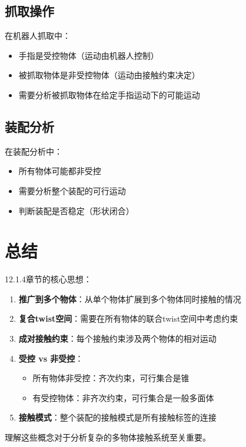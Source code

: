 \documentclass[12pt,a4paper]{article}
\begin{document}
\subsection{抓取操作}

在机器人抓取中：
\begin{itemize}
\item 手指是受控物体（运动由机器人控制）
\item 被抓取物体是非受控物体（运动由接触约束决定）
\item 需要分析被抓取物体在给定手指运动下的可能运动
\end{itemize}

\subsection{装配分析}

在装配分析中：
\begin{itemize}
\item 所有物体可能都非受控
\item 需要分析整个装配的可行运动
\item 判断装配是否稳定（形状闭合）
\end{itemize}

\section{总结}

12.1.4章节的核心思想：

\begin{enumerate}
\item \textbf{推广到多个物体}：从单个物体扩展到多个物体同时接触的情况

\item \textbf{复合twist空间}：需要在所有物体的联合twist空间中考虑约束

\item \textbf{成对接触约束}：每个接触约束涉及两个物体的相对运动

\item \textbf{受控 vs 非受控}：
  \begin{itemize}
  \item 所有物体非受控：齐次约束，可行集合是锥
  \item 有受控物体：非齐次约束，可行集合是一般多面体
  \end{itemize}

\item \textbf{接触模式}：整个装配的接触模式是所有接触标签的连接
\end{enumerate}

理解这些概念对于分析复杂的多物体接触系统至关重要。
\end{document}
